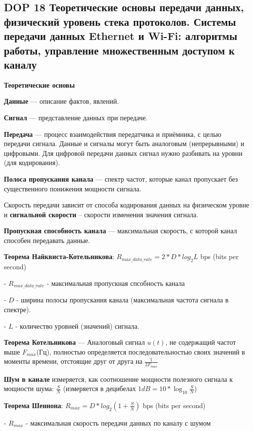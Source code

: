 \subsection*{DOP 18 Теоретические основы передачи данных, физический уровень стека протоколов. Системы передачи данных Ethernet и Wi-Fi: алгоритмы работы, управление множественным доступом к каналу}

\textbf{Теоретические основы}


\textbf{Данные} --- описание фактов, явлений.

\textbf{Сигнал} --- представление данных при передаче.

\textbf{Передача} --- процесс взаимодействия передатчика и приёмника, с целью передачи сигнала.
Данные и сигналы могут быть аналоговым (непрерывными) и цифровыми.
Для цифровой передачи данных сигнал нужно разбивать на уровни (для кодирования).

\textbf{Полоса пропускания канала} --- спектр частот, которые канал пропускает без существенного понижения мощности сигнала.

Скорость передачи зависит от способа кодирования данных на физическом уровне и \textbf{сигнальной скорости} -- скорости изменения значения сигнала.

\textbf{Пропускная способность канала} --- максимальная скорость, с которой канал способен передавать данные.

\bigbreak
\textbf{Теорема Найквиста-Котельникова}: $R_{max\_data\_rate} = 2*D*log_2{L}$ bps (bits per second)

- $R_{max\_data\_rate}$ - максимальная пропускная спсобность канала

- $D$ - ширина полосы пропускания канала (максимальная частота сигнала в спектре).

- $L$ - количество уровней (значений) сигнала.

\bigbreak
\textbf{Теорема Котельникова} --- Аналоговый сигнал $u(t)$, не содержащий частот выше $F_{max}$(Гц), полностью определяется последовательностью своих значений в моменты времени, отстоящие друг от друга на $\frac{1}{2F_{max}}$

\bigbreak
\textbf{Шум в канале} измеряется, как соотношение мощности полезного сигнала к мощности шума: $\frac{S}{N}$ (измеряется в децибелах $1dB = 10*\log_{10}{\frac{S}{N}}$)

\bigbreak
\textbf{Теорема Шеннона}: $R_{max} = D*log_2{(1+\frac{S}{N})}$ bps (bits per second)

- $R_{max}$ - максимальная скорость передачи данных по каналу с шумом

